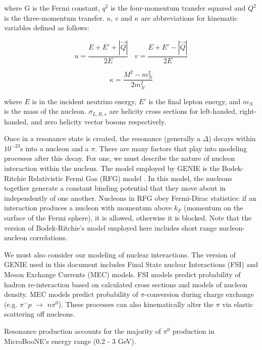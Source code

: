 \noindent where G is the Fermi constant, $q^2$ is the four-momentum transfer squared and $Q^2$ is the three-momentum transfer. $u$, $v$ and $\kappa$ are abbreviations for kinematic variables defined as follows:

\begin{equation}
 u = \frac{E + E' + |\vec{Q}|}{2E}\ \ \ \  v = \frac{E + E' - |\vec{Q}|}{2E}
\end{equation}

\begin{equation}
 \kappa = \frac{M^2 - m_{N}^2}{2m_{N}^2}
\end{equation}

\noindent where $E$ is in the incident neutrino energy, $E'$ is the final lepton energy, and $m_N$ is the mass of the nucleon.  $\sigma_{L,R,s}$ are helicity cross sections for left-handed, right-handed, and zero helicity vector bosons respectively. 

\par  Once in a resonance state is created, the resonance (generally a $\Delta$) decays within $10^{-23}$s into a nucleon and a $\pi$.  There are many factors that play into modeling processes after this decay.  For one, we must describe the nature of nucleon interaction within the nucleus. The model employed by GENIE is the Bodek-Ritchie Relativistic Fermi Gas (RFG) model \cite{bib:bodek_ritchie}.  In this model, the nucleons together generate a constant binding potential that they move about in independently of one another. Nucleons in RFG obey Fermi-Dirac statistics: if an interaction produces a nucleon with momentum above $k_F$ (momentum on the surface of the Fermi sphere), it is allowed, otherwise it is blocked. Note that the version of Bodek-Ritchie's model employed here includes short range nucleon-nucleon correlations. 

We must also consider our modeling of nuclear interactions. The version of GENIE used in this document includes Final State nuclear Interactions (FSI) and Meson Exchange Currents (MEC) models. FSI models predict probability of hadron re-interaction based on calculated cross sections and models of nucleon density. MEC models predict probability of $\pi$-conversion during charge exchange (e.g. $\pi^- p$ $\rightarrow$ $n \pi^0$). These processes can also kinematically alter the $\pi$ via elastic scattering off nucleons.

Resonance production accounts for the majority of $\pi^0$ production in MicroBooNE's energy range (0.2 - 3 GeV). 


